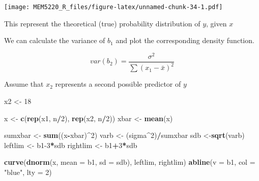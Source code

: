 \documentclass[]{book}
\newenvironment{Shaded}{\begin{snugshade}}{\end{snugshade}}
\newcommand{\DataTypeTok}[1]{\textcolor[rgb]{0.13,0.29,0.53}{#1}}
\newcommand{\DecValTok}[1]{\textcolor[rgb]{0.00,0.00,0.81}{#1}}
\newcommand{\KeywordTok}[1]{\textcolor[rgb]{0.13,0.29,0.53}{\textbf{#1}}}
\newcommand{\NormalTok}[1]{#1}
\newcommand{\OperatorTok}[1]{\textcolor[rgb]{0.81,0.36,0.00}{\textbf{#1}}}
\newcommand{\StringTok}[1]{\textcolor[rgb]{0.31,0.60,0.02}{#1}}
\begin{document}
\texttt{[image: MEM5220\_R\_files/figure-latex/unnamed-chunk-34-1.pdf]}

This represent the theoretical (true) probability distribution of \(y\), given \(x\)

We can calculate the variance of \(b_{1}\) and plot the corresponding density function.

\begin{equation}
var(b_2) = \frac{\sigma^2}{\sum{}{}(x_1 - \bar{x})^2}
\label{eq:variancebeta}
\end{equation}

Assume that \(x_{2}\) represents a second possible predictor of \(y\)

\begin{Shaded}
\begin{Highlighting}[]
\NormalTok{x2 <-}\StringTok{ }\DecValTok{18}

\NormalTok{x <-}\StringTok{ }\KeywordTok{c}\NormalTok{(}\KeywordTok{rep}\NormalTok{(x1, n}\OperatorTok{/}\DecValTok{2}\NormalTok{), }\KeywordTok{rep}\NormalTok{(x2, n}\OperatorTok{/}\DecValTok{2}\NormalTok{))}
\NormalTok{xbar <-}\StringTok{ }\KeywordTok{mean}\NormalTok{(x)}

\NormalTok{sumxbar <-}\StringTok{ }\KeywordTok{sum}\NormalTok{((x}\OperatorTok{-}\NormalTok{xbar)}\OperatorTok{^}\DecValTok{2}\NormalTok{)}
\NormalTok{varb <-}\StringTok{ }\NormalTok{(sigma}\OperatorTok{^}\DecValTok{2}\NormalTok{)}\OperatorTok{/}\NormalTok{sumxbar}
\NormalTok{sdb <-}\KeywordTok{sqrt}\NormalTok{(varb)}
\NormalTok{leftlim <-}\StringTok{ }\NormalTok{b1}\DecValTok{-3}\OperatorTok{*}\NormalTok{sdb}
\NormalTok{rightlim <-}\StringTok{ }\NormalTok{b1}\OperatorTok{+}\DecValTok{3}\OperatorTok{*}\NormalTok{sdb}
\end{Highlighting}
\end{Shaded}

\begin{Shaded}
\begin{Highlighting}[]
\KeywordTok{curve}\NormalTok{(}\KeywordTok{dnorm}\NormalTok{(x, }\DataTypeTok{mean =}\NormalTok{ b1, }\DataTypeTok{sd =}\NormalTok{ sdb), leftlim, rightlim)}
\KeywordTok{abline}\NormalTok{(}\DataTypeTok{v =}\NormalTok{ b1, }\DataTypeTok{col =} \StringTok{"blue"}\NormalTok{, }\DataTypeTok{lty =} \DecValTok{2}\NormalTok{)}
\end{Highlighting}
\end{Shaded}
\end{document}
